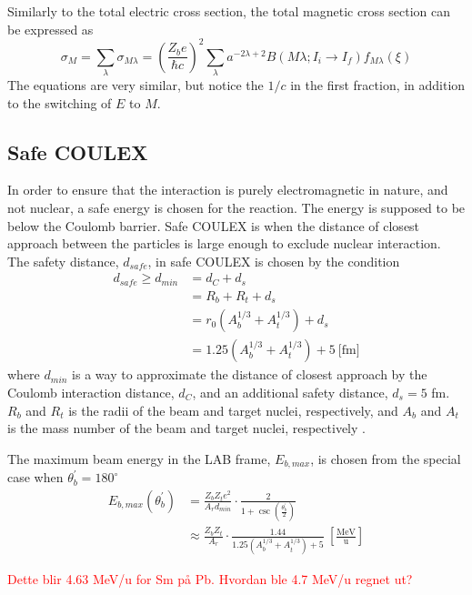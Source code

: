 \documentclass[twoside,english]{uiofysmaster/uiofysmaster}
\begin{document}
Similarly to the total electric cross section, the total magnetic cross section can be expressed as \cite{EE-Coulex}
\begin{equation}
	\sigma_M = \sum_\lambda \sigma_{M \lambda} = \left( \frac{Z_b e}{\hbar c} \right)^2 \sum_\lambda a^{-2 \lambda + 2} B(M \lambda; I_i \rightarrow I_f) f_{M \lambda} (\xi)
\end{equation}
The equations are very similar, but notice the $1/c$ in the first fraction, in addition to the switching of $E$ to $M$.


\subsection{Safe COULEX}
In order to ensure that the interaction is purely electromagnetic in nature, and not nuclear, a safe energy is chosen for the reaction. 
The energy is supposed to be below the Coulomb barrier.
Safe COULEX is when the distance of closest approach between the particles is large enough to exclude nuclear interaction.
The safety distance, $d_{safe}$, in safe COULEX is chosen by the condition
\begin{align}
	d_{safe} \geq d_{min} &= d_C + d_s \nonumber \\
	&= R_b + R_t + d_s \nonumber \\
	&= r_0 (A_b^{1/3} + A_t^{1/3}) + d_s \nonumber \\
	&= 1.25 (A_b^{1/3} + A_t^{1/3}) + 5~\text{[fm]}
\end{align}
where $d_{min}$ is a way to approximate the distance of closest approach by the Coulomb interaction distance, $d_C$, and an additional safety distance, $d_s = 5$ fm.
$R_b$ and $R_t$ is the radii of the beam and target nuclei, respectively, and $A_b$ and $A_t$ is the mass number of the beam and target nuclei, respectively \cite{RBass, Cline1986}.

The maximum beam energy in the LAB frame, $E_{b, max}$, is chosen from the special case when $\theta_b^{'} = 180^\circ$ \cite{Klintefjord, RBass}
\begin{align}
	E_{b, max} (\theta_b^{'})
	&= \frac{Z_b Z_t e^2}{A_r d_{min}} \cdot \frac{2}{1 + \csc \left( \frac{\theta_b^{'}}{2} \right)} \\
	&\approx \frac{Z_b Z_t}{A_r} \cdot \frac{1.44}{1.25 (A_b^{1/3} + A_t^{1/3}) + 5} ~\left[ \tfrac{\text{MeV}}{\text{u}} \right]
\end{align}

\textcolor{red}{Dette blir 4.63 MeV/u for Sm på Pb. Hvordan ble 4.7 MeV/u regnet ut?}
\end{document}
